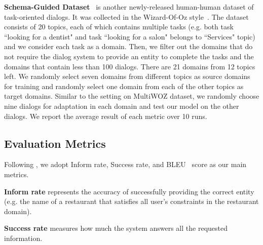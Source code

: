 \documentclass[letterpaper]{article} %
\begin{document}
\noindent\textbf{Schema-Guided Dataset}~\citep{rastogi2019towards} is another newly-released human-human dataset of task-oriented dialogs. It was collected in the Wizard-Of-Oz style~\citep{Kelley1984AnID}. The dataset consists of 20 topics, each of which contains multiple tasks (e.g. both task ``looking for a dentist" and task ``looking for a salon" belongs to ``Services" topic) and we consider each task as a domain. Then, we filter out the domains that do not require the dialog system to provide an entity to complete the tasks and the domains that contain less than 100 dialogs. There are 21 domains from 12 topics left. We randomly select seven domains from different topics as source domains for training and randomly select one domain from each of the other topics as target domains. Similar to the setting on MultiWOZ dataset, we randomly choose nine dialogs for adaptation in each domain and test our model on the other dialogs. We report the average result of each metric over 10 runs.



\subsection*{Evaluation Metrics}

Following \citet{budzianowski2018multiwoz}, we adopt Inform rate, Success rate, and BLEU~\citep{Papineni2002BleuAM} score as our main metrics. 

\noindent\textbf{Inform rate} represents the accuracy of successfully providing the correct entity (e.g. the name of a restaurant that satisfies all user's constraints in the restaurant domain). 

\noindent\textbf{Success rate} measures how much the system answers all the requested information. 
\end{document}
